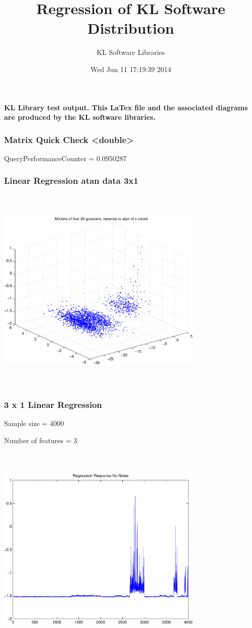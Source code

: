 \documentclass[9pt]{article}
\theoremstyle{plain}
\theoremstyle{definition}
\theoremstyle{remark}
\numberwithin{equation}{section}
\begin{document}
\title{Regression of KL Software Distribution   }
\author{KL Software Libraries}
\date{Wed Jun 11 17:19:39 2014
}
\maketitle
\textbf{ KL Library test output.  This LaTex file and the associated diagrams are produced by the KL software libraries.}
\subsubsection{Matrix Quick Check <double>}
QueryPerformanceCounter  =  0.0950287
\subsubsection{Linear Regression atan data 3x1}
\includegraphics[width=10.0cm,height=10.0cm]{AtanDataSet.pdf}

\subsubsection{3 x 1 Linear Regression}
Sample size = 4000

Number of features = 3

\includegraphics[width=10.0cm,height=10.0cm]{AtanDataSet_regression_response_no_noise.pdf}
\end{document}
